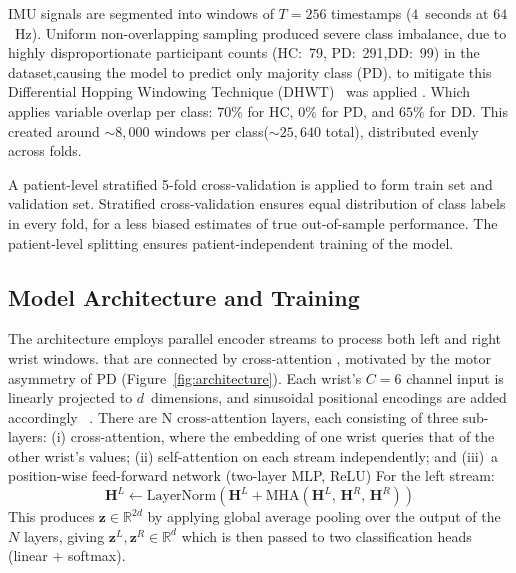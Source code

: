 \documentclass[pmlr]{jmlr}
\begin{document}
IMU signals are segmented into windows of $T{=}256$ timestamps
($4$~seconds at $64$~Hz). Uniform non-overlapping sampling produced severe class imbalance, due to highly disproportionate participant counts (HC:~79, PD:~291,DD:~99) in the dataset,causing the model to predict only majority class (PD). to mitigate this Differential Hopping Windowing Technique (DHWT)~\citep{soumma2025liftpd}  was applied . Which applies variable overlap per class: $70\%$ for HC, $0\%$ for PD, and $65\%$ for DD\@.
This created around ${\sim}8{,}000$ windows per class(${\sim}25{,}640$ total), distributed evenly across folds.

A patient-level stratified 5-fold cross-validation is applied to form train set and validation set. Stratified cross-validation ensures equal distribution of class labels in every fold, for a less biased estimates of true out-of-sample performance. The patient-level splitting ensures patient-independent training of the model.
 


\subsection{Model Architecture and Training}
\label{sec:base_model}
The architecture employs parallel encoder streams to process both left and right wrist windows. that are connected by cross-attention , motivated by
the motor asymmetry of PD (Figure~\ref{fig:architecture}).
Each wrist's $C{=}6$ channel input is linearly projected to
$d$~dimensions, and sinusoidal positional encodings are added accordingly ~\citep{vaswani2017}. There are N cross-attention layers, each consisting of three sub-layers: (i) cross-attention, where the embedding of one wrist queries that of the other wrist's values; (ii) self-attention on each stream independently; and (iii)~a position-wise feed-forward network (two-layer MLP, ReLU)
For the left stream:
\begin{equation}
  \mathbf{H}^L \leftarrow \mathrm{LayerNorm}\!\left(
      \mathbf{H}^L + \mathrm{MHA}(\mathbf{H}^L,\, \mathbf{H}^R,\,
      \mathbf{H}^R) \right)
\end{equation}
This produces $\mathbf{z} \in \mathbb{R}^{2d}$  by applying global average pooling over the output of the $N$ layers, giving $\mathbf{z}^L, \mathbf{z}^R \in \mathbb{R}^d$ which is then passed to two classification heads (linear + softmax).
\end{document}
